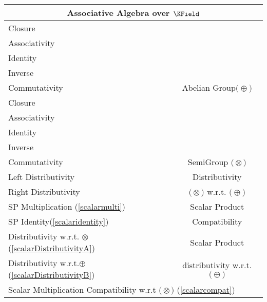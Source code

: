 \documentclass[a4paper,12pt]{scrartcl}    %
\newcommand{\OpA}{\otimes}
\newcommand{\OpB}{\oplus}
\begin{document}
\begin{minipage}[c]{0,5\textwidth}
\vspace{0.6cm}
\begin{tabular}{|l|c|} %
  \hline
  \multicolumn{2}{c}{\cellcolor{green!25}Associative Algebra over $\KField$} \\
  \hline
    \cellcolor{blue!25} \footnotesize Closure& \cellcolor{yellow!25}  \\
    \cellcolor{blue!25} \footnotesize Associativity& \cellcolor{yellow!25}  \\
    \cellcolor{blue!25} \footnotesize Identity& \cellcolor{yellow!25} \\
    \cellcolor{blue!25} \footnotesize Inverse& \cellcolor{yellow!25} \\
    \cellcolor{blue!25} \footnotesize Commutativity& \multirow{-5}{*}{\tiny\cellcolor{yellow!25}Abelian Group$\big(\OpB\big)$} \\
   \hline
    \cellcolor{blue!25} \footnotesize Closure& \cellcolor{yellow!25}  \\
    \cellcolor{blue!25} \footnotesize Associativity& \cellcolor{yellow!25}  \\
    \cellcolor{red!25} \footnotesize Identity& \cellcolor{yellow!25} \\
    \cellcolor{red!25} \footnotesize Inverse& \cellcolor{yellow!25} \\
    \cellcolor{red!25} \footnotesize Commutativity& \multirow{-5}{*}{\tiny\cellcolor{yellow!25} SemiGroup $\big(\OpA\big)$} \\
  \hline
  	\cellcolor{blue!25} \footnotesize Left Distributivity&  \tiny\cellcolor{yellow!25}Distributivity\\
    \cellcolor{blue!25} \footnotesize Right Distributivity & \tiny\cellcolor{yellow!25} $\big(\OpA\big)$ w.r.t. $\big(\OpB\big)$  \\
   \hline
  \hline
     \cellcolor{blue!25} \footnotesize SP Multiplication (\ref{scalarmulti})&  \tiny\cellcolor{yellow!25}Scalar Product\\
    \cellcolor{blue!25} \footnotesize SP Identity(\ref{scalaridentity}) & \tiny\cellcolor{yellow!25} Compatibility  \\
   \hline 
    \cellcolor{blue!25} \footnotesize Distributivity w.r.t. $\OpA$ (\ref{scalarDistributivityA})&  \tiny\cellcolor{yellow!25}Scalar Product\\
    \cellcolor{blue!25} \footnotesize Distributivity w.r.t.$\OpB$ (\ref{scalarDistributivityB}) & \tiny\cellcolor{yellow!25} distributivity w.r.t. $\big(\OpB\big)$  \\
   \hline
    \multicolumn{2}{l}{\footnotesize \cellcolor{blue!25} Scalar Multiplication Compatibility w.r.t  $\big(\OpA\big)$ (\ref{scalarcompat})}\\
   \hline
\end{tabular}

\end{minipage}
\end{document}
